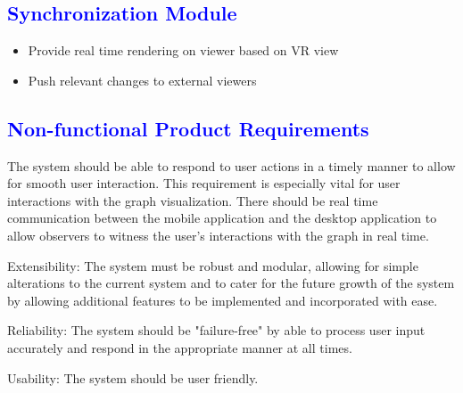 \documentclass[12pt]{article}
\begin{document}
\begin{flushleft}
	\textcolor{blue}{\subsection{Synchronization Module}}	
	\begin{flushleft}
	\begin{itemize}
	\item Provide real time rendering on viewer based on VR view
	\item Push relevant changes to external viewers
	\end{itemize}	
	\end{flushleft}

\end{flushleft}

\textcolor{blue}{\section{Non-functional Product Requirements}}
\begin{flushleft}
The system should be able to respond to user actions in a timely manner to allow for smooth user interaction. This requirement is especially vital for user interactions with the graph visualization. There should be real time communication between the mobile application and the desktop application to allow observers to witness the user’s interactions with the graph in real time.

\bigskip

Extensibility: The system must be robust and modular, allowing for simple alterations to the current system and to cater for the future growth of the system by allowing additional features to be implemented and incorporated with ease.

\bigskip

Reliability: The system should be "failure-free" by able to process user input accurately and respond in the appropriate manner at all times.

\bigskip

Usability: The system should be user friendly. 

\end{flushleft}
\end{document}
